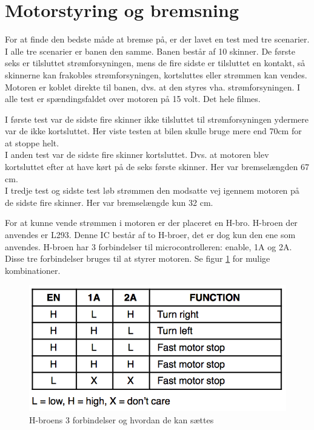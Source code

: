 \section{Motorstyring og bremsning}
For at finde den bedste måde at bremse på, er der lavet en test med tre scenarier. I alle tre scenarier er banen den samme. Banen består af 10 skinner. De første seks er tilsluttet strømforsyningen, mens de fire sidste er tilsluttet en kontakt, så skinnerne kan frakobles strømforsyningen, kortsluttes eller strømmen kan vendes. Motoren er koblet direkte til banen, dvs. at den styres vha. strømforsyningen. I alle test er spændingsfaldet over motoren på 15 volt. Det hele filmes. \\


I første test var de sidste fire skinner ikke tilsluttet til strømforsyningen ydermere var de ikke kortsluttet. Her viste testen at bilen skulle bruge mere end 70cm for at stoppe helt. \\
I anden test var de sidste fire skinner kortsluttet. Dvs. at motoren blev kortsluttet efter at have kørt på de seks første skinner. Her var bremselængden 67 cm. \\
I tredje test og sidste test løb strømmen den modsatte vej igennem motoren på de sidste fire skinner. Her var bremselængde kun 32 cm. \\


For at kunne vende strømmen i motoren er der placeret en H-bro. H-broen der anvendes er L293. Denne IC består af to H-broer, det er dog kun den ene som anvendes. H-broen har 3 forbindelser til microcontrolleren: enable, 1A og 2A. Disse tre forbindelser bruges til at styrer motoren. Se figur \ref{hbro_forbindelse} for mulige kombinationer. 

\begin{figure}[h!]
\center
\includegraphics[scale=0.35]{./Graphics/h-bro_forbindelse.png}
\caption{H-broens 3 forbindelser og hvordan de kan sættes}
\label{hbro_forbindelse}
\end{figure}

